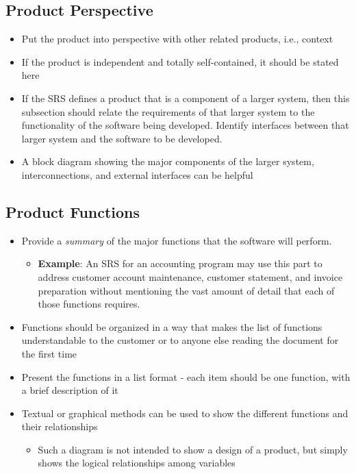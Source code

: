 \documentclass[]{article}
\begin{document}
\subsection{Product Perspective}
\label{sub:product_perspective}
\begin{itemize}
	\item Put the product into perspective with other related products, i.e., context
	\item If the product is independent and totally self-contained, it should be stated here
	\item If the SRS defines a product that is a component of a larger system, then this subsection should relate the requirements of that larger system to the functionality of the software being developed. Identify interfaces between that larger system and the software to be developed.
	\item A block diagram showing the major components of the larger system, interconnections, and external interfaces can be helpful
\end{itemize}

\subsection{Product Functions}
\label{sub:product_functions}
\begin{itemize}
	\item Provide a \emph{summary} of the major functions that the software will perform.
	\begin{itemize}
		\item \textbf{Example}: An SRS for an accounting program may use this part to address customer account maintenance, customer statement, and invoice preparation without mentioning the vast amount of detail that each of those functions requires.
	\end{itemize}
	\item Functions should be organized in a way that makes the list of functions understandable to the customer or to anyone else reading the document for the first time 
	\item Present the functions in a list format - each item should be one function, with a brief description of it
	\item Textual or graphical methods can be used to show the different functions and their relationships
	\begin{itemize}
		\item Such a diagram is not intended to show a design of a product, but simply shows the logical relationships among variables
	\end{itemize} 
\end{itemize}
\end{document}
